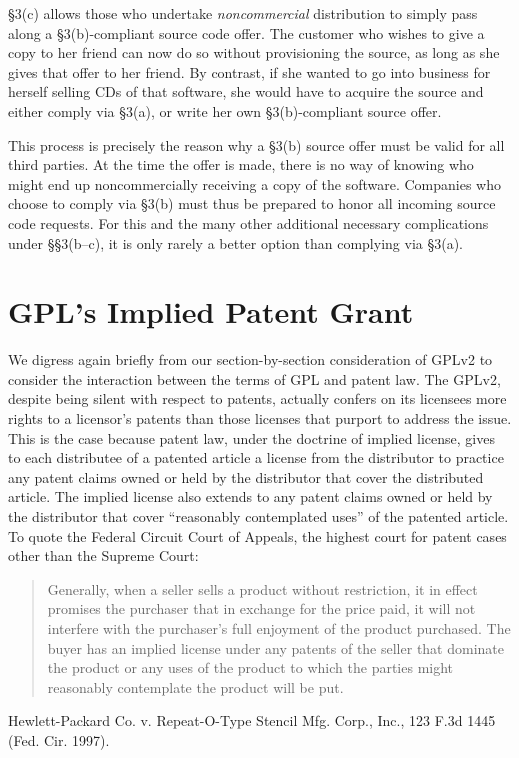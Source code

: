 \S 3(c) allows those who undertake \emph{noncommercial} distribution to
simply pass along a \S 3(b)-compliant source code offer. The customer who
wishes to give a copy to her friend can now do so without provisioning the
source, as long as she gives that offer to her friend. By contrast, if
she wanted to go into business for herself selling CDs of that software,
she would have to acquire the source and either comply via \S 3(a), or
write her own \S 3(b)-compliant source offer.

This process is precisely the reason why a \S 3(b) source offer must be
valid for all third parties. At the time the offer is made, there is no
way of knowing who might end up noncommercially receiving a copy of the
software. Companies who choose to comply via \S 3(b) must thus be
prepared to honor all incoming source code requests. For this and the
many other additional necessary complications under \S\S 3(b--c), it is
only rarely a better option than complying via \S 3(a).

\chapter{GPL's Implied Patent Grant}
\label{gpl-implied-patent-grant}

We digress again briefly from our section-by-section consideration of GPLv2
to consider the interaction between the terms of GPL and patent law. The
GPLv2, despite being silent with respect to patents, actually confers on its
licensees more rights to a licensor's patents than those licenses that
purport to address the issue. This is the case because patent law, under
the doctrine of implied license, gives to each distributee of a patented
article a license from the distributor to practice any patent claims owned
or held by the distributor that cover the distributed article. The
implied license also extends to any patent claims owned or held by the
distributor that cover ``reasonably contemplated uses'' of the patented
article. To quote the Federal Circuit Court of Appeals, the highest court
for patent cases other than the Supreme Court:

\begin{quotation}
Generally, when a seller sells a product without restriction, it in
effect promises the purchaser that in exchange for the price paid, it will
not interfere with the purchaser's full enjoyment of the product
purchased. The buyer has an implied license under any patents of the
seller that dominate the product or any uses of the product to which the
parties might reasonably contemplate the product will be put.
\end{quotation}
Hewlett-Packard Co. v. Repeat-O-Type Stencil Mfg. Corp., Inc., 123 F.3d
1445 (Fed. Cir. 1997).

